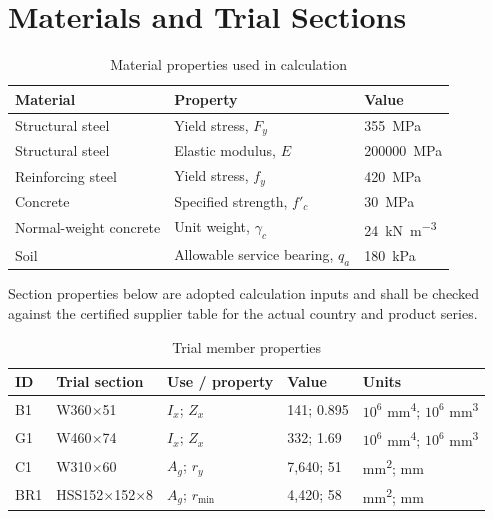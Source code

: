 \section{Materials and Trial Sections}

\begin{table}[htbp]
\centering
\caption{Material properties used in calculation}
\begin{tabularx}{\textwidth}{@{}Y R{34mm} R{34mm}@{}}
  \toprule
  \textbf{Material} & \textbf{Property} & \textbf{Value} \\
  \midrule
  Structural steel & Yield stress, $F_y$ & \SI{355}{\mega\pascal} \\
  Structural steel & Elastic modulus, $E$ & \SI{200000}{\mega\pascal} \\
  Reinforcing steel & Yield stress, $f_y$ & \SI{420}{\mega\pascal} \\
  Concrete & Specified strength, $f'_c$ & \SI{30}{\mega\pascal} \\
  Normal-weight concrete & Unit weight, $\gamma_c$ & \SI{24}{\kilo\newton\per\metre\cubed} \\
  Soil & Allowable service bearing, $q_a$ & \SI{180}{\kilo\pascal} \\
  \bottomrule
\end{tabularx}
\end{table}

Section properties below are adopted calculation inputs and shall be checked against
the certified supplier table for the actual country and product series.

\begin{table}[htbp]
\centering
\caption{Trial member properties}
\begin{tabularx}{\textwidth}{@{}p{18mm}p{28mm}Y R{23mm} R{23mm}@{}}
  \toprule
  \textbf{ID} & \textbf{Trial section} & \textbf{Use / property} & \textbf{Value} & \textbf{Units} \\
  \midrule
  B1 & W360$\times$51 & $I_x$; $Z_x$ & 141; 0.895 & $10^6$ \si{\milli\metre\tothe{4}};
    $10^6$ \si{\milli\metre\cubed} \\
  G1 & W460$\times$74 & $I_x$; $Z_x$ & 332; 1.69 & $10^6$ \si{\milli\metre\tothe{4}};
    $10^6$ \si{\milli\metre\cubed} \\
  C1 & W310$\times$60 & $A_g$; $r_y$ & 7,640; 51 & \si{\milli\metre\squared}; \si{\milli\metre} \\
  BR1 & HSS152$\times$152$\times$8 & $A_g$; $r_{\min}$ & 4,420; 58 &
    \si{\milli\metre\squared}; \si{\milli\metre} \\
  \bottomrule
\end{tabularx}
\end{table}

